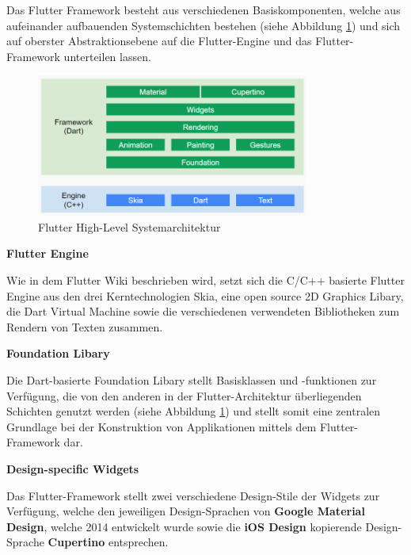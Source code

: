 \documentclass[bibliography=totoc,listof=totoc,BCOR=5mm,DIV=12,oneside]{scrbook}
\begin{document}
\par \bigskip Das Flutter Framework besteht aus verschiedenen Basiskomponenten, welche aus aufeinander aufbauenden Systemschichten bestehen (siehe Abbildung \ref{img:flutterHighLevelSystemOverview}) und sich auf oberster Abstraktionsebene auf die Flutter-Engine und das Flutter-Framework unterteilen lassen.

\bigskip
\begin{figure}[H]
	\centering
	\includegraphics[width=0.8\textwidth, keepaspectratio]{Bilder/highLevelOverview.png}
	\caption{Flutter High-Level Systemarchitektur \cite{Flu5}}
	\label{img:flutterHighLevelSystemOverview}
\end{figure}

\newpage

\par \bigskip \textbf{Flutter Engine}
\par Wie in dem Flutter Wiki \citep{Flu4} beschrieben wird, setzt sich die C/C++ basierte Flutter Engine aus den drei Kerntechnologien Skia\citep{Skia1}, eine open source 2D Graphics Libary, die Dart Virtual Machine sowie die verschiedenen verwendeten Bibliotheken zum Rendern von Texten zusammen.

\par \bigskip \textbf{Foundation Libary}
\par Die Dart-basierte Foundation Libary\citep{FoundationLibary} stellt Basisklassen und -funktionen zur Verfügung, die von den anderen in der Flutter-Architektur überliegenden Schichten genutzt werden (siehe Abbildung \ref{img:flutterHighLevelSystemOverview}) und stellt somit eine zentralen Grundlage bei der Konstruktion von Applikationen mittels dem Flutter-Framework dar.

\par \bigskip \textbf{Design-specific Widgets}
\par Das Flutter-Framework stellt zwei verschiedene Design-Stile der Widgets zur Verfügung, welche den jeweiligen Design-Sprachen von \textbf{Google Material Design}\citep{Mat1}, welche 2014 entwickelt wurde sowie die \textbf{iOS Design}\citep{iOSDesign} kopierende Design-Sprache \textbf{Cupertino}\citep{Cup1} entsprechen.
\end{document}
